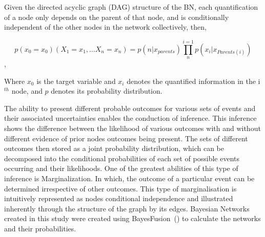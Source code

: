 \documentclass[fleqn,10pt]{wlscirep}
\begin{document}


Given the directed acyclic graph (DAG) structure of the BN, each quantification of a node only depends on the parent of that node, and is conditionally independent of the other nodes in the network collectively, then,

\begin{equation}
        p(x_{0}=x_{0}) (X_{1}=x_{1},\ldots X_{n}=x_{n})=p(n|x_{parents})\prod_{n}^{i=1}p(x_{i}|x_{Parents(i)})
\end{equation},

Where $x_0$ is the target variable and $x_i$ denotes the quantified information in the i$^{th}$ node, and $p$ denotes its probability distribution.

The ability to present different probable outcomes for various sets of events and their associated uncertainties enables the conduction of inference. This inference shows the difference between the likelihood of various outcomes with and without different evidence of prior nodes outcomes being present. The sets of different outcomes then stored as a joint probability distribution, which can be decomposed into the conditional probabilities of each set of possible events occurring and their likelihoods. One of the greatest abilities of this type of inference is Marginalization. In which, the outcome of a particular event can be determined irrespective of other outcomes. This type of marginalisation is intuitively represented as nodes conditional independence and illustrated inherently through the structure of the graph by its edges. Bayesian Networks created in this study were created using BayesFusion~(\cite{bayesfusionGeNIeModelerUSER2022}) to calculate the networks and their probabilities. 
\end{document}
